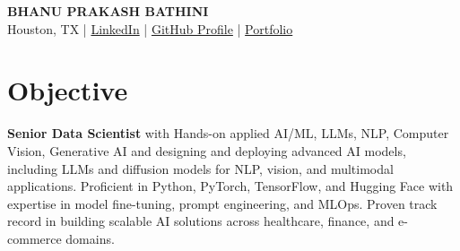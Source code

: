 \documentclass[11pt,letterpaper]{article}
\begin{document}
\begin{center}

  {\Huge\bfseries\color{HEADINGBLUE} BHANU PRAKASH BATHINI}\\[4pt]
  {\normalsize Houston, TX \quad|\quad
   \href{https://www.linkedin.com/}{LinkedIn} \quad|\quad
   \href{https://github.com/}{GitHub Profile} \quad|\quad
   \href{https://portfolio.dev/}{Portfolio}}
\end{center}


\vspace{-20pt}
\section*{Objective}
\vspace{-20pt}

\noindent\textbf{Senior Data Scientist} with Hands-on applied AI/ML, LLMs, NLP, Computer Vision,
Generative AI and designing and deploying advanced AI models, including LLMs and diffusion models
for NLP, vision, and multimodal applications. Proficient in Python, PyTorch, TensorFlow, and Hugging
Face with expertise in model fine-tuning, prompt engineering, and MLOps. Proven track record in
building scalable AI solutions across healthcare, finance, and e-commerce domains.
\vspace{-30pt}
\end{document}
